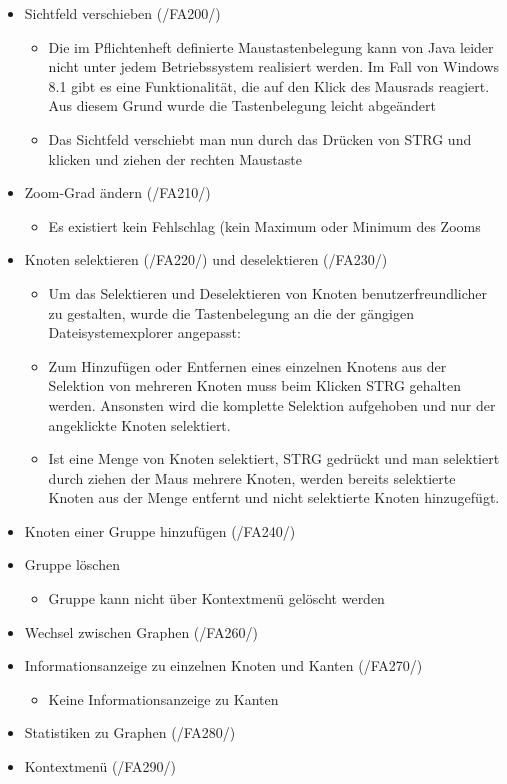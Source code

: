 \begin{itemize}
	\item Sichtfeld verschieben (/FA200/)
		\begin{itemize}
			\item Die im Pflichtenheft definierte Maustastenbelegung kann von Java leider nicht unter jedem Betriebssystem realisiert werden. Im Fall von Windows 8.1 gibt es eine Funktionalität, die auf den Klick des Mausrads reagiert. Aus diesem Grund wurde die Tastenbelegung leicht abgeändert
			\item Das Sichtfeld verschiebt man nun durch das Drücken von STRG und klicken und ziehen der rechten Maustaste
		\end{itemize}
	\item Zoom-Grad ändern (/FA210/)
		\begin{itemize}
			\item Es existiert kein Fehlschlag (kein Maximum oder Minimum des Zooms
		\end{itemize}
	\item Knoten selektieren (/FA220/) und deselektieren (/FA230/)
		\begin{itemize}
			\item Um das Selektieren und Deselektieren von Knoten benutzerfreundlicher zu gestalten, wurde die Tastenbelegung an die der gängigen Dateisystemexplorer angepasst:
			\item Zum Hinzufügen oder Entfernen eines einzelnen Knotens aus der Selektion von mehreren Knoten muss beim Klicken STRG gehalten werden. Ansonsten wird die komplette Selektion aufgehoben und nur der angeklickte Knoten selektiert.
			\item Ist eine Menge von Knoten selektiert, STRG gedrückt und man selektiert durch ziehen der Maus mehrere Knoten, werden bereits selektierte Knoten aus der Menge entfernt und nicht selektierte Knoten hinzugefügt.
		\end{itemize}
	\item Knoten einer Gruppe hinzufügen (/FA240/)
	\item Gruppe löschen
		\begin{itemize}
			\item Gruppe kann nicht über Kontextmenü gelöscht werden
		\end{itemize}
	\item Wechsel zwischen Graphen (/FA260/)
	\item Informationsanzeige zu einzelnen Knoten und Kanten (/FA270/)
		\begin{itemize}
			\item Keine Informationsanzeige zu Kanten
		\end{itemize}
	\item Statistiken zu Graphen (/FA280/)
	\item Kontextmenü (/FA290/)
\end{itemize}

